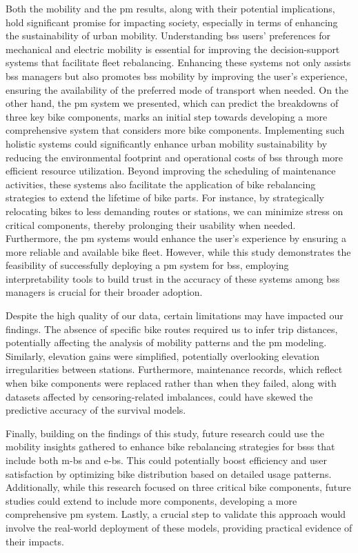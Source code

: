 Both the mobility and the \ac{pm} results, along with their potential implications, hold significant promise for impacting society, especially in terms of enhancing the sustainability of urban mobility. Understanding \ac{bss} users' preferences for mechanical and electric mobility is essential for improving the decision-support systems that facilitate fleet rebalancing. Enhancing these systems not only assists \ac{bss} managers but also promotes \ac{bss} mobility by improving the user's experience, ensuring the availability of the preferred mode of transport when needed. On the other hand, the \ac{pm} system we presented, which can predict the breakdowns of three key bike components, marks an initial step towards developing a more comprehensive system that considers more bike components. Implementing such holistic systems could significantly enhance urban mobility sustainability by reducing the environmental footprint and operational costs of \ac{bss} through more efficient resource utilization. Beyond improving the scheduling of maintenance activities, these systems also facilitate the application of bike rebalancing strategies to extend the lifetime of bike parts. For instance, by strategically relocating bikes to less demanding routes or stations, we can minimize stress on critical components, thereby prolonging their usability when needed. Furthermore, the \ac{pm} systems would enhance the user’s experience by ensuring a more reliable and available bike fleet. However, while this study demonstrates the feasibility of successfully deploying a \ac{pm} system for \ac{bss}, employing interpretability tools to build trust in the accuracy of these systems among \ac{bss} managers is crucial for their broader adoption. 

Despite the high quality of our data, certain limitations may have impacted our findings. The absence of specific bike routes required us to infer trip distances, potentially affecting the analysis of mobility patterns and the \ac{pm} modeling. Similarly, elevation gains were simplified, potentially overlooking elevation irregularities between stations. Furthermore, maintenance records, which reflect when bike components were replaced rather than when they failed, along with datasets affected by censoring-related imbalances, could have skewed the predictive accuracy of the survival models.

Finally, building on the findings of this study, future research could use the mobility insights gathered to enhance bike rebalancing strategies for \acp{bss} that include both \acp{m-b} and \acp{e-b}. This could potentially boost efficiency and user satisfaction by optimizing bike distribution based on detailed usage patterns. Additionally, while this research focused on three critical bike components, future studies could extend to include more components, developing a more comprehensive \ac{pm} system. Lastly, a crucial step to validate this approach would involve the real-world deployment of these models, providing practical evidence of their impacts.
